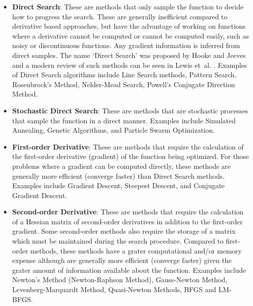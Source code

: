 \begin{bibunit}
\begin{itemize}
	\item \textbf{Direct Search}: These are methods that only sample the function to decide how to progress the search. These are generally inefficient compared to derivative based approaches, but have the advantage of working on functions where a derivative cannot be computed or cannot be computed easily, such as noisy or discontinuous functions. Any gradient information is inferred from direct samples. The name `Direct Search' was proposed by Hooke and Jeeves \cite{Hooke1961} and a modern review of such methods can be seen in Lewis et~al. \cite{Lewis2000}. Examples of Direct Search algorithms include Line Search methods, Pattern Search, Rosenbrock's Method, Nelder-Mead Search, Powell's Conjugate Direction Method.
	\item \textbf{Stochastic Direct Search}: These are methods that are stochastic processes that sample the function in a direct manner. Examples include Simulated Annealing, Genetic Algorithms, and Particle Swarm Optimization.
	\item \textbf{First-order Derivative}: These are methods that require the calculation of the first-order derivative (gradient) of the function being optimized. For those problems where a gradient can be computed directly, these methods are generally more efficient (converge faster) than Direct Search methods. Examples include Gradient Descent, Steepest Descent, and Conjugate Gradient Descent.
	\item \textbf{Second-order Derivative}: These are methods that require the calculation of a Hessian matrix of second-order derivatives in addition to the first-order gradient. Some second-order methods also require the storage of a matrix which must be maintained during the search procedure. Compared to first-order methods, these methods have a grater computational and/or memory expense although are generally more efficient (converge faster) given the grater amount of information available about the function. Examples include Newton's Method (Newton-Raphson Method), Gauss-Newton Method, Levenberg-Marquardt Method, Quasi-Newton Methods, BFGS and LM-BFGS.
\end{itemize}


\end{bibunit}
